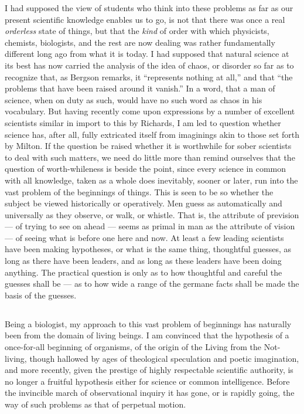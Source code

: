 \documentclass[a4paper, 11pt, oneside, polutonikogreek, english]{article}
\begin{document}
I had supposed the view of students who think into these problems as far as our present scientific knowledge enables us to go, is not that there was once a real \emph{orderless} state of things, but that the \emph{kind} of order with which physicists, chemists, biologists, and the rest are now dealing was rather fundamentally different long ago from what it is today. I had supposed that natural science at its best has now carried the analysis of the idea of chaos, or disorder so far as to recognize that, as Bergson remarks, it ``represents nothing at all,'' and that ``the problems that have been raised around it vanish.'' In a word, that a man of science, when on duty as such, would have no such word as chaos in his vocabulary. But having recently come upon expressions by a number of excellent scientists similar in import to this by Richards, I am led to question whether science has, after all, fully extricated itself from imaginings akin to those set forth by Milton. If the question be raised whether it is worthwhile for sober scientists to deal with such matters, we need do little more than remind ourselves that the question of worth-whileness is beside the point, since every science in common with all knowledge, taken as a whole does inevitably, sooner or later, run into the vast problem of the beginnings of things. This is seen to be so whether the subject be viewed historically or operatively. Men guess as automatically and universally as they observe, or walk, or whistle. That is, the attribute of prevision --- of trying to see on ahead --- seems as primal in man as the attribute of vision --- of seeing what is before one here and now. At least a few leading scientists have been making hypotheses, or what is the same thing, thoughtful guesses, as long as there have been leaders, and as long as these leaders have been doing anything. The practical question is only as to how thoughtful and careful the guesses shall be --- as to how wide a range of the germane facts shall be made the basis of the guesses.

\subsection{}
\paragraph{}
Being a biologist, my approach to this vast problem of beginnings has naturally been from the domain of living beings. I am convinced that the hypothesis of a once-for-all beginning of organisms, of the origin of the Living from the Not-living, though hallowed by ages of theological speculation and poetic imagination, and more recently, given the prestige of highly respectable scientific authority, is no longer a fruitful hypothesis either for science or common intelligence. Before the invincible march of observational inquiry it has gone, or is rapidly going, the way of such problems as that of perpetual motion.
\end{document}
